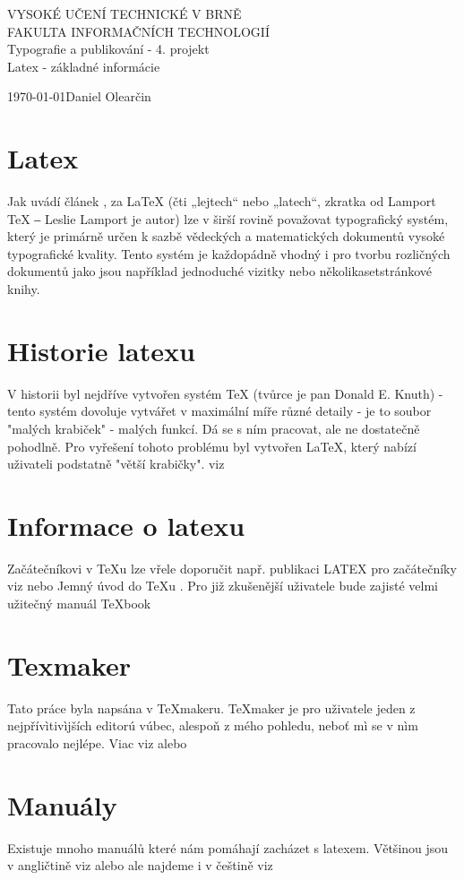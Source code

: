\documentclass[a4paper, 11pt]{article}
\begin{document}
	\begin{titlepage}
		\begin{center}
			\huge{VYSOKÉ UČENÍ TECHNICKÉ V BRNĚ}\\
			\LARGE{FAKULTA INFORMAČNÍCH TECHNOLOGIÍ}\\
			\Large{Typografie a publikování - 4. projekt}\\
			\huge{Latex - základné informácie}\\
		\end{center}
		\Large{\today \hfill Daniel Olearčin}
	\end{titlepage}
\setcounter{page}{1}
\section{Latex}
Jak uvádí článek \cite{Davidek},
za LaTeX (čti „lejtech“ nebo „latech“, zkratka od Lamport TeX ‒ Leslie Lamport je autor) lze v širší rovině považovat typografický systém, který je primárně určen k sazbě vědeckých a matematických dokumentů vysoké typografické kvality. Tento systém je každopádně vhodný i pro tvorbu rozličných dokumentů jako jsou například jednoduché vizitky nebo několikasetstránkové knihy.
\section{Historie latexu}
V historii byl nejdříve vytvořen systém TeX (tvůrce je pan Donald E. Knuth) - tento systém dovoluje vytvářet v maximální míře různé detaily - je to soubor "malých krabiček" - malých funkcí. Dá se s ním pracovat, ale ne dostatečně pohodlně. Pro vyřešení tohoto problému byl vytvořen LaTeX, který nabízí uživateli podstatně "větší krabičky". viz \cite{Frcatel}
\section{Informace o latexu}
Začátečníkovi v \TeX u lze vřele doporučit např. publikaci LATEX pro začátečníky viz \cite{Rybicka} nebo Jemný úvod do \TeX u \cite{Doob}. Pro již zkušenější uživatele bude zajisté velmi užitečný manuál \TeX book \cite{Knuth}
\section{Texmaker}
Tato práce byla napsána v TeXmakeru. TeXmaker je pro uživatele jeden z nejpřívìtivìjších editorú vúbec, alespoň z mého pohledu, neboť mì se v nìm pracovalo nejlépe. Viac viz \cite{Bartlik} alebo \cite{texmaker}
\section{Manuály}
Existuje mnoho manuálů které nám pomáhají zacházet s latexem. Většinou jsou v angličtině viz \cite{manen1} alebo \cite{manen2} ale najdeme i v češtině viz \cite{mancz}

\newpage


\end{document}
